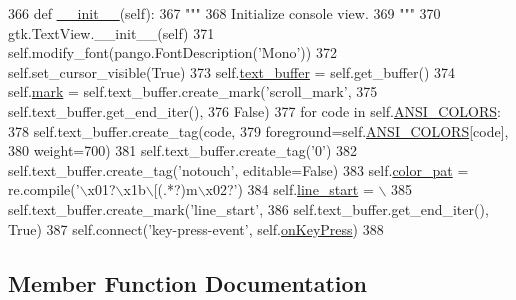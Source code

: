 \begin{DoxyCode}
366   \textcolor{keyword}{def }\hyperlink{classvisualizer_1_1ipython__view_1_1ConsoleView_a8d033bc05540b44d393b8ef5394036a8}{\_\_init\_\_}(self):
367     \textcolor{stringliteral}{"""}
368 \textcolor{stringliteral}{    Initialize console view.}
369 \textcolor{stringliteral}{    """}
370     gtk.TextView.\_\_init\_\_(self)
371     self.modify\_font(pango.FontDescription(\textcolor{stringliteral}{'Mono'}))
372     self.set\_cursor\_visible(\textcolor{keyword}{True})
373     self.\hyperlink{classvisualizer_1_1ipython__view_1_1ConsoleView_af41c734d92634ed48bb4265c383aa12a}{text\_buffer} = self.get\_buffer()
374     self.\hyperlink{classvisualizer_1_1ipython__view_1_1ConsoleView_a8e2760df8ab32c588ad92c3fd6a65fd5}{mark} = self.text\_buffer.create\_mark(\textcolor{stringliteral}{'scroll\_mark'},
375                                              self.text\_buffer.get\_end\_iter(),
376                                              \textcolor{keyword}{False})
377     \textcolor{keywordflow}{for} code \textcolor{keywordflow}{in} self.\hyperlink{classvisualizer_1_1ipython__view_1_1ConsoleView_a48b8c29be2e81f0e3c66d91bfc2f4edf}{ANSI\_COLORS}:
378       self.text\_buffer.create\_tag(code, 
379                                   foreground=self.\hyperlink{classvisualizer_1_1ipython__view_1_1ConsoleView_a48b8c29be2e81f0e3c66d91bfc2f4edf}{ANSI\_COLORS}[code], 
380                                   weight=700)
381     self.text\_buffer.create\_tag(\textcolor{stringliteral}{'0'})
382     self.text\_buffer.create\_tag(\textcolor{stringliteral}{'notouch'}, editable=\textcolor{keyword}{False})
383     self.\hyperlink{classvisualizer_1_1ipython__view_1_1ConsoleView_a9d43382a2506937e365f52365dde79a4}{color\_pat} = re.compile(\textcolor{stringliteral}{'\(\backslash\)x01?\(\backslash\)x1b\(\backslash\)[(.*?)m\(\backslash\)x02?'})
384     self.\hyperlink{classvisualizer_1_1ipython__view_1_1ConsoleView_a9593fe742cea9fb6fb0a2f15400a9a11}{line\_start} = \(\backslash\)
385         self.text\_buffer.create\_mark(\textcolor{stringliteral}{'line\_start'}, 
386                                      self.text\_buffer.get\_end\_iter(), \textcolor{keyword}{True})
387     self.connect(\textcolor{stringliteral}{'key-press-event'}, self.\hyperlink{classvisualizer_1_1ipython__view_1_1ConsoleView_afa9fdb78cf6e461f4ae4fec60df73bba}{onKeyPress})
388     
\end{DoxyCode}


\subsection{Member Function Documentation}
